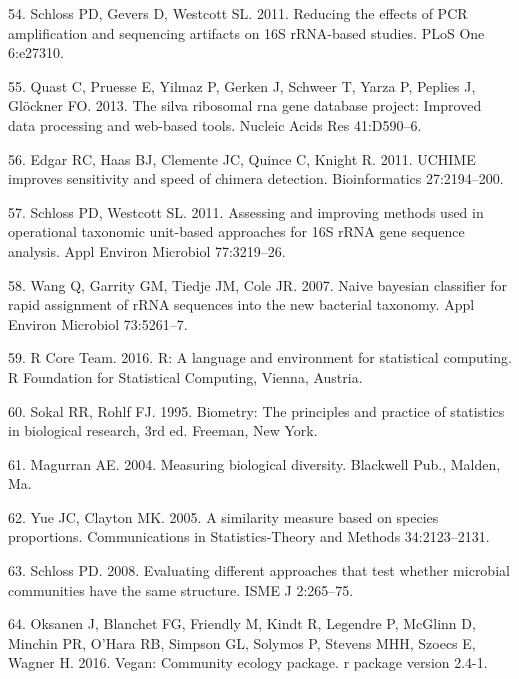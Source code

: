 \documentclass[12pt,]{article}
\begin{document}
\hypertarget{ref-schloss_PCRartifacts_2011}{}
54. Schloss PD, Gevers D, Westcott SL. 2011. Reducing the effects of PCR
amplification and sequencing artifacts on 16S rRNA-based studies. PLoS
One 6:e27310.

\hypertarget{ref-Quast_silva_2013}{}
55. Quast C, Pruesse E, Yilmaz P, Gerken J, Schweer T, Yarza P, Peplies
J, Glöckner FO. 2013. The silva ribosomal rna gene database project:
Improved data processing and web-based tools. Nucleic Acids Res
41:D590--6.

\hypertarget{ref-edgar_uchime_2011}{}
56. Edgar RC, Haas BJ, Clemente JC, Quince C, Knight R. 2011. UCHIME
improves sensitivity and speed of chimera detection. Bioinformatics
27:2194--200.

\hypertarget{ref-schloss_OTUanalysis_2011}{}
57. Schloss PD, Westcott SL. 2011. Assessing and improving methods used
in operational taxonomic unit-based approaches for 16S rRNA gene
sequence analysis. Appl Environ Microbiol 77:3219--26.

\hypertarget{ref-wang_taxonomy_2007}{}
58. Wang Q, Garrity GM, Tiedje JM, Cole JR. 2007. Naive bayesian
classifier for rapid assignment of rRNA sequences into the new bacterial
taxonomy. Appl Environ Microbiol 73:5261--7.

\hypertarget{ref-R}{}
59. R Core Team. 2016. R: A language and environment for statistical
computing. R Foundation for Statistical Computing, Vienna, Austria.

\hypertarget{ref-sokal_biometrystats_1995}{}
60. Sokal RR, Rohlf FJ. 1995. Biometry: The principles and practice of
statistics in biological research, 3rd ed. Freeman, New York.

\hypertarget{ref-magurran_measuring_2004}{}
61. Magurran AE. 2004. Measuring biological diversity. Blackwell Pub.,
Malden, Ma.

\hypertarget{ref-yue_thetaYC_2005}{}
62. Yue JC, Clayton MK. 2005. A similarity measure based on species
proportions. Communications in Statistics-Theory and Methods
34:2123--2131.

\hypertarget{ref-schloss_commstruct_2008}{}
63. Schloss PD. 2008. Evaluating different approaches that test whether
microbial communities have the same structure. ISME J 2:265--75.

\hypertarget{ref-oksanen_vegan_2016}{}
64. Oksanen J, Blanchet FG, Friendly M, Kindt R, Legendre P, McGlinn D,
Minchin PR, O'Hara RB, Simpson GL, Solymos P, Stevens MHH, Szoecs E,
Wagner H. 2016. Vegan: Community ecology package. r package version
2.4-1.
\end{document}
